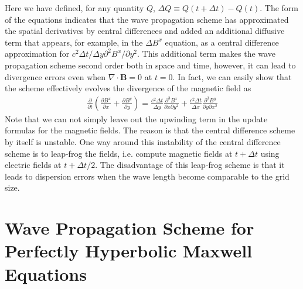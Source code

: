 \documentclass[11pt, reqno]{amsart}
\newcommand{\pfrac}[2]{\frac{\partial #1}{\partial #2}}
\newcommand{\pfraca}[1]{\frac{\partial}{\partial #1}}
\newcommand{\pfracbb}[2]{\partial^2 #1/\partial #2^2}
\newcommand{\mvec}[1]{\mathbf{#1}}
\begin{document}
Here we have defined, for any quantity $Q$, $\Delta Q \equiv
Q(t+\Delta t)-Q(t)$. The form of the equations indicates that the wave
propagation scheme has approximated the spatial derivatives by central
differences and added an additional diffusive term that appears, for
example, in the $\Delta B^x$ equation, as a central difference
approximation for $c^2\Delta t/\Delta y \pfracbb{B^x}{y}$. This
additional term makes the wave propagation scheme second order both in
space and time, however, it can lead to divergence errors even when
$\nabla \cdot \mvec{B} = 0$ at $t=0$. In fact, we can easily show that
the scheme effectively evolves the divergence of the magnetic field as
\begin{align}
  \pfraca{t}
  \left(
    \pfrac{B^x}{x} + \pfrac{B^y}{y}
  \right)
  =
  \frac{c^2 \Delta t}{\Delta y}
  \frac{\partial^3B^x}{\partial x \partial y^2}
  +
  \frac{c^2 \Delta t}{\Delta x}
  \frac{\partial^3B^y}{\partial y \partial x^2}
\end{align}
Note that we can not simply leave out the upwinding term in the update
formulas for the magnetic fields. The reason is that the central
difference scheme by itself is unstable. One way around this
instability of the central difference scheme is to leap-frog the
fields, i.e. compute magnetic fields at $t+\Delta t$ using electric
fields at $t + \Delta t/2$. The disadvantage of this leap-frog scheme
is that it leads to dispersion errors when the wave length become
comparable to the grid size.

\section{Wave Propagation Scheme for Perfectly Hyperbolic Maxwell
  Equations}
\end{document}
